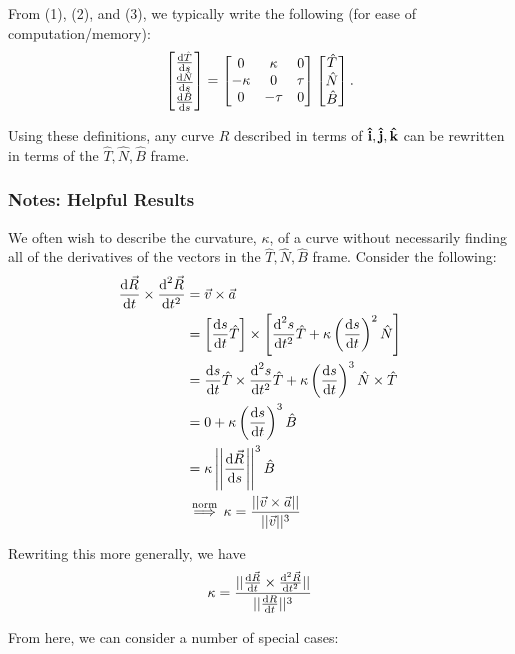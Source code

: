 \documentclass[12pt]{article}
\begin{document}
{From (1), (2), and (3), we typically write the following (for ease of computation/memory): \[\begin{bmatrix}
    \frac{\text{d}\hat{T}}{\text{d}s} \\
    \frac{\text{d}\hat{N}}{\text{d}s} \\
    \frac{\text{d}\hat{B}}{\text{d}s}
\end{bmatrix} = \begin{bmatrix}
   0 & \kappa & 0 \\
    -\kappa & 0 & \tau \\
    0 & -\tau & 0
\end{bmatrix} \begin{bmatrix}
    \hat{T} \\
    \hat{N} \\
    \hat{B}
\end{bmatrix}.\]

Using these definitions, any curve $R$ described in terms of $\vu{i}, \vu{j}, \vu{k}$ can be rewritten in terms of the $\hat{T}, \hat{N}, \hat{B}$ frame.

\subsubsection{Notes: Helpful Results}

We often wish to describe the curvature, $\kappa$, of a curve without necessarily finding all of the derivatives of the vectors in the $\hat{T}, \hat{N}, \hat{B}$ frame. Consider the following: 
\begin{align*}
    \frac{\text{d}\vec{R}}{\text{d}t} \times \frac{\text{d}^2\vec{R}}{\text{d}t^2} &= \vec{v} \times \vec{a}\\
    &=  \left[\frac{\text{d}s}{\text{d}t} \hat{T} \right] \times \left[\frac{\text{d}^2s}{\text{d}t^2} \hat{T} + \kappa \left(\frac{\text{d}s}{\text{d}t}\right)^2 \hat{N}\right]\\
    &= \frac{\text{d}s}{\text{d}t} \hat{T}\times \frac{\text{d}^2s}{\text{d}t^2} \hat{T} + \kappa \left(\frac{\text{d}s}{\text{d}t}\right)^3 \hat{N} \times \hat{T}\\
    &= 0 + \kappa \left(\frac{\text{d}s}{\text{d}t}\right)^3 \hat{B}\\
    &= \kappa \left|\left|\frac{\text{d}\vec{R}}{\text{d}s}\right|\right|^3 \hat{B}\\
    &\overset{\text{norm}}{\implies} \kappa = \frac{||\vec{v}\times\vec{a}||}{||\vec{v}||^3}
\end{align*}

Rewriting this more generally, we have \[\kappa = \frac{||\frac{\text{d}\vec{R}}{\text{d}t} \times \frac{\text{d}^2\vec{R}}{\text{d}t^2}||}{||\frac{\text{d}R}{\text{d}t}||^3}\]

From here, we can consider a number of special cases:

}
\end{document}
